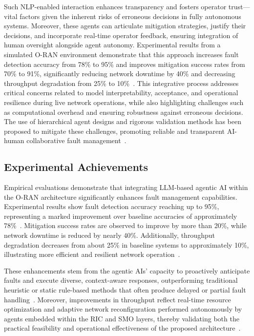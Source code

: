 \documentclass[sigconf]{acmart}
\begin{document}
Such NLP-enabled interaction enhances transparency and fosters operator trust—vital factors given the inherent risks of erroneous decisions in fully autonomous systems. Moreover, these agents can articulate mitigation strategies, justify their decisions, and incorporate real-time operator feedback, ensuring integration of human oversight alongside agent autonomy. Experimental results from a simulated O-RAN environment demonstrate that this approach increases fault detection accuracy from 78\% to 95\% and improves mitigation success rates from 70\% to 91\%, significantly reducing network downtime by 40\% and decreasing throughput degradation from 25\% to 10\%~\cite{ref55}. This integrative process addresses critical concerns related to model interpretability, acceptance, and operational resilience during live network operations, while also highlighting challenges such as computational overhead and ensuring robustness against erroneous decisions. The use of hierarchical agent designs and rigorous validation methods has been proposed to mitigate these challenges, promoting reliable and transparent AI-human collaborative fault management~\cite{ref55}.

\subsection{Experimental Achievements}

Empirical evaluations demonstrate that integrating LLM-based agentic AI within the O-RAN architecture significantly enhances fault management capabilities. Experimental results show fault detection accuracy reaching up to 95\%, representing a marked improvement over baseline accuracies of approximately 78\%~\cite{ref46,ref55,ref27}. Mitigation success rates are observed to improve by more than 20\%, while network downtime is reduced by nearly 40\%. Additionally, throughput degradation decreases from about 25\% in baseline systems to approximately 10\%, illustrating more efficient and resilient network operation~\cite{ref55}. 

These enhancements stem from the agentic AIs’ capacity to proactively anticipate faults and execute diverse, context-aware responses, outperforming traditional heuristic or static rule-based methods that often produce delayed or partial fault handling~\cite{ref27}. Moreover, improvements in throughput reflect real-time resource optimization and adaptive network reconfiguration performed autonomously by agents embedded within the RIC and SMO layers, thereby validating both the practical feasibility and operational effectiveness of the proposed architecture~\cite{ref55}.
\end{document}
